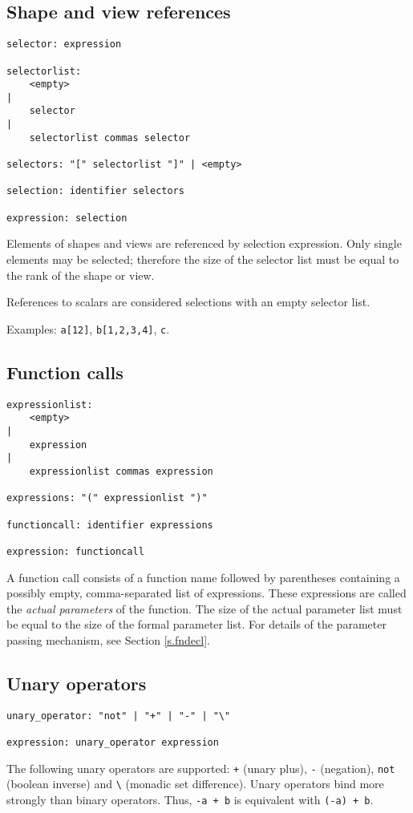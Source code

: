 \documentclass[a4paper]{article}
\newcommand{\defn}[1]{{\em #1}\index{#1}}
\begin{document}
\subsection{Shape and view references}
\begin{verbatim}
selector: expression

selectorlist:
    <empty>
|
    selector
|
    selectorlist commas selector

selectors: "[" selectorlist "]" | <empty>

selection: identifier selectors

expression: selection
\end{verbatim}
Elements of shapes and views are referenced by selection expression.
Only single elements may be selected; therefore the size of the selector
list must be equal to the rank of the shape or view.
\par
References to scalars are considered selections with an empty selector list.
\par
Examples:
\verb"a[12]", \verb"b[1,2,3,4]", \verb"c".
\subsection{Function calls}
\begin{verbatim}
expressionlist:
    <empty>
|
    expression
|
    expressionlist commas expression

expressions: "(" expressionlist ")"

functioncall: identifier expressions

expression: functioncall
\end{verbatim}
A function call consists of a function name followed by 
parentheses containing a possibly empty, comma-separated list of expressions.
These expressions are called the \defn{actual parameters} of the function.
The size of the actual parameter list must be equal to the size of the
formal parameter list.
For details of the parameter passing mechanism, see Section \ref{s.fndecl}.
\subsection{Unary operators}
\begin{verbatim}
unary_operator: "not" | "+" | "-" | "\"

expression: unary_operator expression
\end{verbatim}
The following unary operators are supported: \verb"+" (unary plus),
\verb"-" (negation), {\tt not} (boolean inverse) and \verb"\"
(monadic set difference).
Unary operators bind more strongly than binary operators.
Thus, \verb'-a + b' is equivalent with \verb'(-a) + b'.
\end{document}
